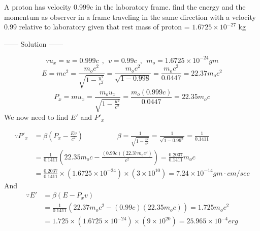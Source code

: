 \newpage
\begin{example}
A proton has velocity 0.999c in the laboratory frame. find the energy and the momentum as observer in a frame traveling in the same direction with a velocity 0.99 relative to laboratory given that rest mass of proton = $1.6725 \times 10^{-27}$ kg
\begin{center}
    ------ \textcolor{Solution}{Solution} ------
\end{center}
\[
\because u_x = u = 0.999c \ \ , \ \ v = 0.99c \ \ , \ \ m_o = 1.6725 \times 10^{-24} \si{gm}
\]
\[
E = m c^2  = \frac{m_o c^2}{\sqrt{1 - \frac{u^2}{c^2}}} = \frac{m_o c^2}{\sqrt{1 - 0.998}} = \frac{m_o c^2}{0.0447} = 22.37 m_o c^2
\]
\[
P_x = m u_x = \frac{m_o u_x}{\sqrt{1 - \frac{u^2}{c^2}}} = \frac{m_o (0.999c)}{0.0447} = 22.35 m_o c
\]
We now need to find $E'$ and $P'_x$


\begin{align*}
    \because P'_x &= \beta\left(P_x - \frac{Ev}{c^2}\right) \hspace{2cm} \beta = \frac{1}{\sqrt{1-\frac{v^2}{c^2}}} = \frac{1}{\sqrt{1-0.99^2}} = \frac{1}{0.1411}\\
    &= \frac{1}{0.1411}\left(22.35 m_o c - \frac{(0.99c)(22.37 m_o c^2)}{c^2}\right) = \frac{0.2037}{0.1411}m_o c\\
    &= \frac{0.2037}{0.1411} \times \left(1.6725 \times 10^{-24}\right) \times \left(3 \times 10^{10}\right) = 7.24 \times 10^{-14} \si{gm} \cdot \si{cm/sec}
\end{align*}
And
\begin{align*}
    \because E' &= \beta\left(E - P_xv\right)\\
    &=\frac{1}{0.1411} \left(22.37 m_o c^2 - (0.99c)(22.35 m_o c)\right) = 1.725 m_o c^2\\
    &=1.725 \times \left(1.6725 \times 10^{-24}\right) \times \left(9 \times 10^{20}\right) = 25.965 \times 10^{-4} \si{erg}
\end{align*}
\end{example}

